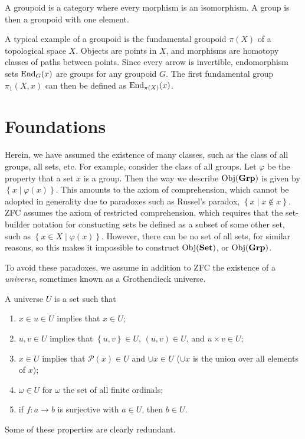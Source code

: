 \begin{definition}[Groupoid]\label{dfn:1.9}
	A groupoid is a category where every morphism is an isomorphism. A group is then a groupoid with one element.
\end{definition}

A typical example of a groupoid is the fundamental groupoid $\pi \left( X \right) $ of a topological space $X$. Objects are points in $X$, and morphisms are homotopy classes of paths between points. Since every arrow is invertible, endomorphism sets $\operatorname{End}_{G}(x) $ are groups for any groupoid $G$. The first fundamental group $\pi _1(X,x)$ can then be defined as $\operatorname{End}_{\pi (X)}(x) $.

\section{Foundations}

Herein, we have assumed the existence of many classes, such as the class of all groups, all sets, etc. For example, consider the class of all groups. Let $\varphi $ be the property that a set $x$ is a group. Then the way we describe $\operatorname{Obj}(\mathbf{Grp} ) $ is given by $\left\{ x\mid \varphi (x) \right\} $. This amounts to the axiom of comprehension, which cannot be adopted in generality due to paradoxes such as Russel's paradox, $\left\{ x\mid x\notin x \right\} $. ZFC assumes the axiom of restricted comprehension, which requires that the set-builder notation for constucting sets be defined as a subset of some other set, such as $\left\{ x\in X\mid \varphi (x) \right\} $. However, there can be no set of all sets, for similar reasons, so this makes it impossible to construct $\operatorname{Obj}(\mathbf{Set} ) $, or $\operatorname{Obj}(\mathbf{Grp} ) $.

To avoid these paradoxes, we assume in addition to ZFC the existence of a \emph{universe}, sometimes known as a Grothendieck universe.

\begin{definition}[Universe]\label{dfn:1.10}
	A universe $U$ is a set such that
	\begin{enumerate}
		\item $x\in u\in U$ implies that $x\in U$;
		\item $u,v\in U$ implies that $\left\{ u,v \right\} \in U$, $(u,v)\in U$, and $u\times v\in U$;
		\item $x\in U$ implies that $\mathscr{P} (x)\in U$ and $\cup x\in U$ ($\cup x$ is the union over all elements of $x$);
		\item $\omega \in U$ for $\omega $ the set of all finite ordinals;
		\item if $f : a \to b$ is surjective with $a\in U$, then $b\in U$.
	\end{enumerate}
	Some of these properties are clearly redundant.
\end{definition}

